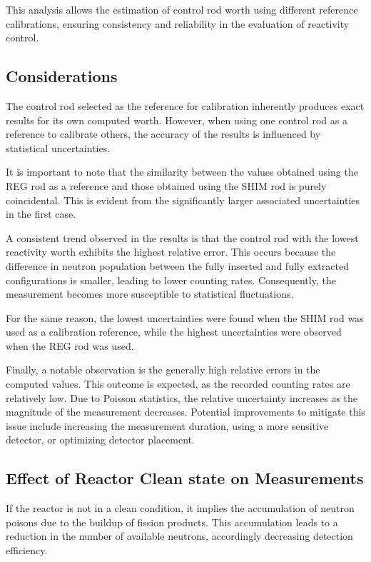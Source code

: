 This analysis allows the estimation of control rod worth using different reference calibrations, ensuring consistency and reliability in the evaluation of reactivity control.


\subsection{Considerations}

The control rod selected as the reference for calibration inherently produces exact results for its own computed worth. However, when using one control rod as a reference to calibrate others, the accuracy of the results is influenced by statistical uncertainties.

It is important to note that the similarity between the values obtained using the REG rod as a reference and those obtained using the SHIM rod is purely coincidental. This is evident from the significantly larger associated uncertainties in the first case.

A consistent trend observed in the results is that the control rod with the lowest reactivity worth exhibits the highest relative error. This occurs because the difference in neutron population between the fully inserted and fully extracted configurations is smaller, leading to lower counting rates. Consequently, the measurement becomes more susceptible to statistical fluctuations.

For the same reason, the lowest uncertainties were found when the SHIM rod was used as a calibration reference, while the highest uncertainties were observed when the REG rod was used.

Finally, a notable observation is the generally high relative errors in the computed values. This outcome is expected, as the recorded counting rates are relatively low. Due to Poisson statistics, the relative uncertainty increases as the magnitude of the measurement decreases. Potential improvements to mitigate this issue include increasing the measurement duration, using a more sensitive detector, or optimizing detector placement.


\subsection{Effect of Reactor Clean state on Measurements}

If the reactor is not in a clean condition, it implies the accumulation of neutron poisons due to the buildup of fission products. This accumulation leads to a reduction in the number of available neutrons, accordingly decreasing detection efficiency.

